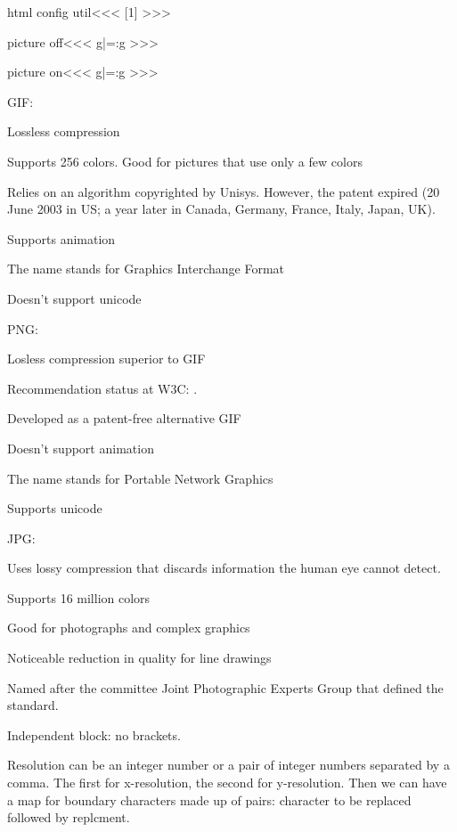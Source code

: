 {{{\<html config util\><<<     
[1]{\def\PictExt{#1}}
>>>

\<picture off\><<<
\let\im:g|=\noim:g
>>>

\<picture on\><<<
\let\im:g|=\xim:g
>>>



GIF:
\List{*}

\item
  Lossless compression 
\item  Supports 256 colors. Good for pictures that use only a few colors
\item Relies on an algorithm copyrighted by Unisys.  However, the patent 
expired (20 June 2003 in US; a year later in Canada, Germany,
France, Italy, Japan, UK).
\item Supports animation
\item
The name stands for Graphics Interchange Format
\item  Doesn't support unicode
\EndList


PNG:

\List{*}
\item Losless compression superior to GIF
\item Recommendation status at W3C:
  \EndLink{}.
\item Developed as a patent-free alternative GIF
\item Doesn't support animation
\item The name stands for Portable Network Graphics
\item Supports unicode
\EndList



JPG:
\List{*}
\item 
Uses lossy compression that discards information the human eye cannot detect.
\item
Supports  16 million colors
\item 
Good for photographs and complex graphics
\item
Noticeable reduction in quality for line drawings
\item  Named after the committee Joint Photographic Experts Group
that defined the standard.
\EndList



Independent block: no brackets.

Resolution can be an integer number or a pair of integer numbers
separated by a comma. The first for x-resolution, the second for
y-resolution. Then we can have a map for boundary characters made
up of pairs: character to be replaced followed by replcment.


}}}
